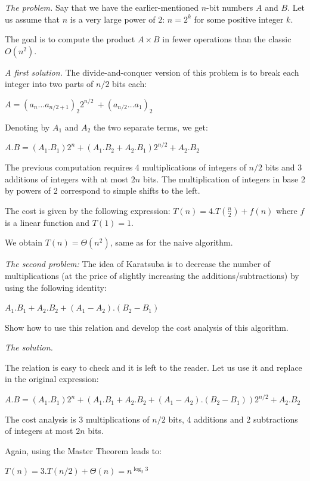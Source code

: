 \noindent \textit{The problem.}
Say that we have the earlier-mentioned $n$-bit numbers $A$ and $B$.  Let us assume that $n$ is a very large power of $2$: $n=2^k$ for some positive integer $k$.

The goal is to compute the product $A \times B$ in fewer operations than the classic $O(n^2)$.

\medskip

\noindent \textit{A first solution.}
The divide-and-conquer version of this problem is to break each integer into two parts
of $n/2$ bits each:

$A=(a_n\ldots a_{n/2+1})_2 2^{n/2}\ + (a_{n/2}\ldots a_1)_2$

Denoting by $A_1$ and $A_2$ the two separate terms, we get:

$A.B = (A_1.B_1) 2^n + (A_1.B_2 + A_2.B_1) 2^{n/2} + A_2.B_2$
\medskip

The previous computation requires 4 multiplications of integers of $n/2$ bits 
and 3 additions of integers with at most $2n$ bits. The multiplication of integers in base 2 by powers of 2 
correspond to simple shifts to the left. 

The cost is given by the following expression: $T(n) = 4.T(\frac{n}{2}) + f(n)$ where $f$ is a linear function
and $T(1) = 1$.

We obtain $T(n) = \Theta(n^2)$, same as for the naive algorithm.
\bigskip
 
\noindent \textit{The second problem:}
The idea of Karatsuba is to decrease the number of multiplications 
(at the price of slightly increasing the additions/subtractions) by using the following identity:

$A_1.B_1 + A_2.B_2 + (A_1-A_2).(B_2-B_1)$

Show how to use this relation and develop the cost analysis of this algorithm.
\medskip

\noindent \textit{The solution.}

The relation is easy to check and it is left to the reader. 
Let us use it and replace in the original expression:

$A.B = (A_1.B_1) 2^n + (A_1.B_1 + A_2.B_2 + (A_1-A_2).(B_2-B_1)) 2^{n/2} + A_2.B_2$

The cost analysis is 3 multiplications of $n/2$ bits,
4 additions and 2 subtractions of integers at most $2n$ bits. 

Again, using the Master Theorem leads to:

$T(n) = 3.T(n/2) + \Theta (n) = n^{\log_2 3}$



